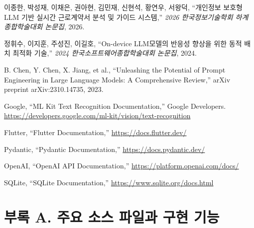 \documentclass[11pt,a4paper]{article}
\begin{document}
\begin{enumerate}[label={[\arabic*]}]
    \item\label{ref_privacy_llm} 이종한, 박성재, 이채은, 권아현, 김민재, 신현석, 황연우, 서왕덕,
    ``개인정보 보호형 LLM 기반 실시간 근로계약서 분석 및 가이드 시스템,''
    \textit{2026 한국정보기술학회 하계 종합학술대회 논문집}, 2026.

    \item 정휘수, 이지훈, 주성진, 이길호,
    ``On-device LLM모델의 반응성 향상을 위한 동적 배치 최적화 기술,''
    \textit{2024 한국소프트웨어종합학술대회 논문집}, 2024.

    \item B. Chen, Y. Chen, X. Jiang, et al.,
    ``Unleashing the Potential of Prompt Engineering in Large Language Models: A Comprehensive Review,''
    arXiv preprint arXiv:2310.14735, 2023.

    \item\label{ref_mlkit} Google,
    ``ML Kit Text Recognition Documentation,''
    Google Developers.
    \url{https://developers.google.com/ml-kit/vision/text-recognition}

    \item\label{ref_flutter} Flutter,
    ``Flutter Documentation,''
    \url{https://docs.flutter.dev/}

    \item\label{ref_pydantic} Pydantic,
    ``Pydantic Documentation,''
    \url{https://docs.pydantic.dev/}

    \item\label{ref_openai} OpenAI,
    ``OpenAI API Documentation,''
    \url{https://platform.openai.com/docs/}

    \item\label{ref_sqlite} SQLite,
    ``SQLite Documentation,''
    \url{https://www.sqlite.org/docs.html}
\end{enumerate}

\newpage

\section*{부록 A. 주요 소스 파일과 구현 기능}
\end{document}
